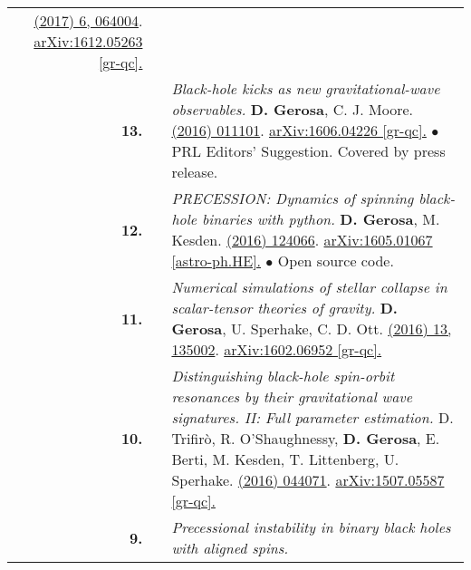 {\begin{longtable}{rp{0.3cm}p{15.8cm}}
\href{http://dx.doi.org/10.1088/1361-6382/aa5e58}{\cqg 34 (2017) 6, 064004}. \href{https://arxiv.org/abs/1612.05263}{arXiv:1612.05263 [gr-qc].}
\vspace{0.09cm}\\
%
\textbf{13.} & & \textit{Black-hole kicks as new gravitational-wave observables.}
\newline{}
\textbf{D. Gerosa}, C. J. Moore.
\newline{}
\href{http://dx.doi.org/10.1103/PhysRevLett.117.011101}{\prl 117 (2016) 011101}. \href{https://arxiv.org/abs/1606.04226}{arXiv:1606.04226 [gr-qc].}
\newline{}
\textcolor{color1}{$\bullet$} PRL Editors' Suggestion. Covered by press release.
\vspace{0.09cm}\\
%
\textbf{12.} & & \textit{PRECESSION: Dynamics of spinning black-hole binaries with python.}
\newline{}
\textbf{D. Gerosa}, M. Kesden.
\newline{}
\href{http://dx.doi.org/10.1103/PhysRevD.93.124066}{\prd 93 (2016) 124066}. \href{https://arxiv.org/abs/1605.01067}{arXiv:1605.01067 [astro-ph.HE].}
\newline{}
\textcolor{color1}{$\bullet$} Open source code.
\vspace{0.09cm}\\
%
\textbf{11.} & & \textit{Numerical simulations of stellar collapse in scalar-tensor theories of gravity.}
\newline{}
\textbf{D. Gerosa}, U. Sperhake, C. D. Ott.
\newline{}
\href{http://dx.doi.org/10.1088/0264-9381/33/13/135002}{\cqg 33 (2016) 13, 135002}. \href{https://arxiv.org/abs/1602.06952}{arXiv:1602.06952 [gr-qc].}
\vspace{0.09cm}\\
%
\textbf{10.} & & \textit{Distinguishing black-hole spin-orbit resonances by their gravitational wave signatures. II: Full parameter estimation.}
\newline{}
D. Trifir\`o, R. O'Shaughnessy, \textbf{D. Gerosa}, E. Berti, M. Kesden, T. Littenberg, U. Sperhake.
\newline{}
\href{http://dx.doi.org/10.1103/PhysRevD.93.044071}{\prd 93 (2016) 044071}. \href{https://arxiv.org/abs/1507.05587}{arXiv:1507.05587 [gr-qc].}
\vspace{0.09cm}\\
%
\textbf{9.} & & \textit{Precessional instability in binary black holes with aligned spins.}

\end{longtable}}
